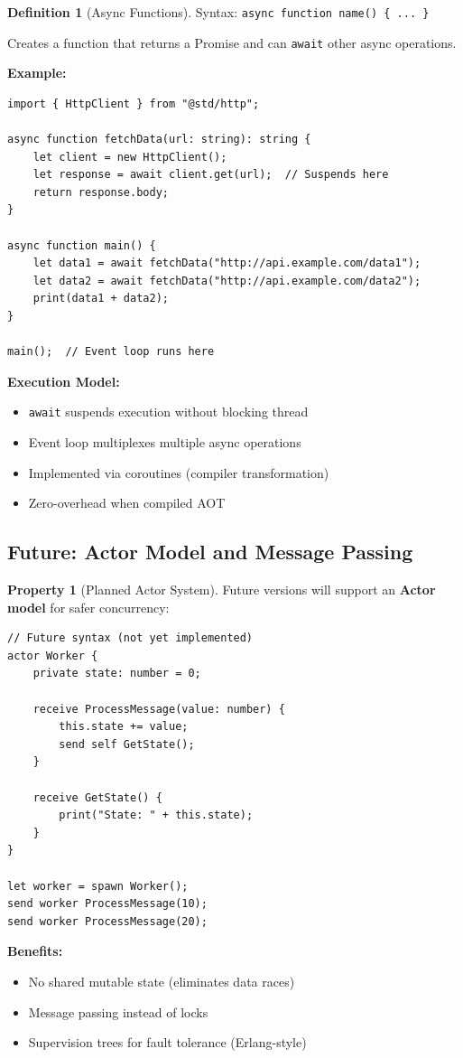 \documentclass[12pt,a4paper]{article}
\theoremstyle{definition}
\newtheorem{definition}{Definition}[section]
\newtheorem{property}{Property}[section]
\begin{document}
\begin{definition}[Async Functions]
Syntax: \texttt{async function name() \{ ... \}}

Creates a function that returns a Promise and can \texttt{await} other async operations.

\textbf{Example:}
\begin{lstlisting}[language=Dryad]
import { HttpClient } from "@std/http";

async function fetchData(url: string): string {
    let client = new HttpClient();
    let response = await client.get(url);  // Suspends here
    return response.body;
}

async function main() {
    let data1 = await fetchData("http://api.example.com/data1");
    let data2 = await fetchData("http://api.example.com/data2");
    print(data1 + data2);
}

main();  // Event loop runs here
\end{lstlisting}

\textbf{Execution Model:}
\begin{itemize}[leftmargin=*]
    \item \texttt{await} suspends execution without blocking thread
    \item Event loop multiplexes multiple async operations
    \item Implemented via coroutines (compiler transformation)
    \item Zero-overhead when compiled AOT
\end{itemize}
\end{definition}

\subsection{Future: Actor Model and Message Passing}

\begin{property}[Planned Actor System]
Future versions will support an \textbf{Actor model} for safer concurrency:

\begin{lstlisting}[language=Dryad]
// Future syntax (not yet implemented)
actor Worker {
    private state: number = 0;
    
    receive ProcessMessage(value: number) {
        this.state += value;
        send self GetState();
    }
    
    receive GetState() {
        print("State: " + this.state);
    }
}

let worker = spawn Worker();
send worker ProcessMessage(10);
send worker ProcessMessage(20);
\end{lstlisting}

\textbf{Benefits:}
\begin{itemize}[leftmargin=*]
    \item No shared mutable state (eliminates data races)
    \item Message passing instead of locks
    \item Supervision trees for fault tolerance (Erlang-style)
\end{itemize}
\end{property}
\end{document}
